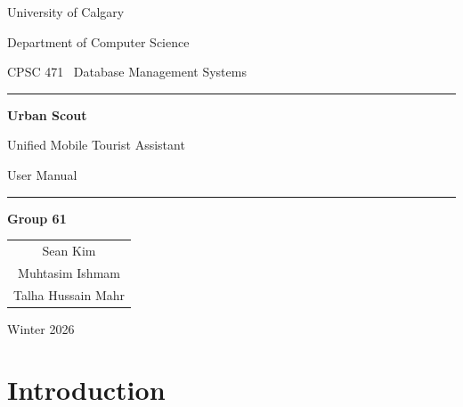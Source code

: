 \documentclass[11pt,letterpaper]{article}
\begin{document}
\begin{titlepage}
    \centering

    \vspace*{1.5cm}

    {\large University of Calgary\par}
    \vspace{0.3cm}
    {\large Department of Computer Science\par}

    \vspace{0.8cm}
    {\Large CPSC 471 \textendash\ Database Management Systems\par}

    \vspace{1.0cm}
    \rule{\linewidth}{0.5mm}

    \vspace{1.2cm}
    {\Huge\bfseries Urban Scout\par}

    \vspace{0.6cm}
    {\LARGE Unified Mobile Tourist Assistant\par}

    \vspace{0.8cm}
    {\Large User Manual\par}

    \vspace{1.2cm}
    \rule{\linewidth}{0.5mm}

    \vspace{1.5cm}
    {\Large\bfseries Group 61\par}

    \vspace{1.0cm}
    \begin{tabular}{c}
        \Large Sean Kim \\[0.4em]
        \Large Muhtasim Ishmam \\[0.4em]
        \Large Talha Hussain Mahr \\
    \end{tabular}

    \vfill

    {\large Winter 2026\par}

    \vspace{0.5cm}
\end{titlepage}

\tableofcontents
\newpage

\section{Introduction}
\end{document}
